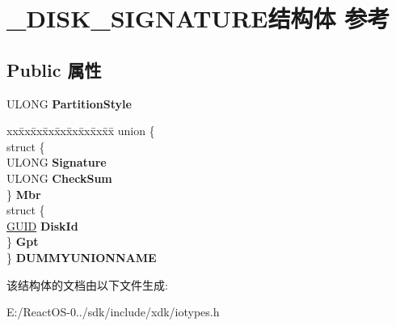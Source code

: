 \hypertarget{struct___d_i_s_k___s_i_g_n_a_t_u_r_e}{}\section{\+\_\+\+D\+I\+S\+K\+\_\+\+S\+I\+G\+N\+A\+T\+U\+R\+E结构体 参考}
\label{struct___d_i_s_k___s_i_g_n_a_t_u_r_e}
\subsection*{Public 属性}
\begin{DoxyCompactItemize}
\item 
\mbox{\label{struct___d_i_s_k___s_i_g_n_a_t_u_r_e_a47f3efe79a37002741ed5d3f4f26b21d}} 
U\+L\+O\+NG {\bfseries Partition\+Style}
\item 
\mbox{\label{struct___d_i_s_k___s_i_g_n_a_t_u_r_e_ab8177c82844fd649aecc6025b9663226}} 
\begin{tabbing}
xx\=xx\=xx\=xx\=xx\=xx\=xx\=xx\=xx\=\kill
union \{\\
\>struct \{\\
\>\>ULONG {\bfseries Signature}\\
\>\>ULONG {\bfseries CheckSum}\\
\>\} {\bfseries Mbr}\\
\>struct \{\\
\>\>\hyperlink{interface_g_u_i_d}{GUID} {\bfseries DiskId}\\
\>\} {\bfseries Gpt}\\
\} {\bfseries DUMMYUNIONNAME}\\

\end{tabbing}\end{DoxyCompactItemize}


该结构体的文档由以下文件生成\+:\begin{DoxyCompactItemize}
\item 
E\+:/\+React\+O\+S-\/0../sdk/include/xdk/iotypes.\+h\end{DoxyCompactItemize}
